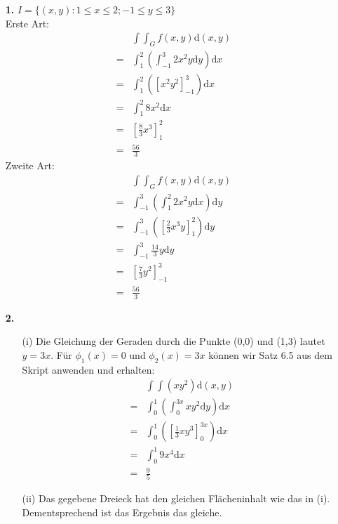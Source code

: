 \documentclass[a4paper,11pt]{article}
\title{\titleinfo}
\author{\authorinfotitle}
\date{\today}
\begin{document}
\maketitle
    \begin{enumerate}

            \item[\textbf{1.}]
                $I = \{ (x,y): 1 \leq x \leq 2; -1 \leq y \leq 3 \}$\\
                Erste Art:
                \begin{align}
                    & \int \int_G f(x,y) \mathrm{d}(x,y)\\
                    = & \int_1^2 \left( \int_{-1}^3 2x^2y \mathrm{d}y\right)\mathrm{d}x\\
                    = & \int_1^2 \left( [x^2y^2]_{-1}^3 \right)\mathrm{d}x\\
                    = & \int_1^2 8x^2\mathrm{d}x\\
                    = & [\frac{8}{3}x^3]_1^2\\
                    = & \frac{56}{3}
                \end{align}
                Zweite Art:
                \begin{align}
                    & \int \int_G f(x,y) \mathrm{d}(x,y)\\
                    = & \int_{-1}^3 \left( \int_1^2 2x^2y \mathrm{d}x \right) \mathrm{d}y\\
                    = & \int_{-1}^3 \left( [ \frac{2}{3}x^3 y ]_1^2 \right) \mathrm{d}y\\
                    = & \int_{-1}^3 \frac{14}{3}y \mathrm{d}y\\
                    = & [ \frac{7}{3}y^2 ]_{-1}^{3}\\
                    = & \frac{56}{3}
                \end{align}
            \item[\textbf{2.}]
                \begin{enumerate}
                    \item[(i)]
                        Die Gleichung der Geraden durch die Punkte (0,0) und (1,3) lautet $y=3x$.
                        Für $\phi_1(x) = 0$ und $\phi_2(x)=3x$ können wir Satz 6.5 aus dem Skript anwenden und erhalten:
                        \begin{align*}
                            & \int \int (xy^2) \mathrm{d}(x,y)\\
                            = & \int_0^1 \left( \int_0^{3x} xy^2 \mathrm{d}y \right) \mathrm{d}x\\
                            = & \int_0^1 \left( [\frac{1}{3}xy^3]_0^{3x} \right) \mathrm{d}x\\
                            = & \int_0^1 9x^4 \mathrm{d}x\\
                            = & \frac{9}{5}
                        \end{align*}
                    \item[(ii)]
                        Das gegebene Dreieck hat den gleichen Flächeninhalt wie das in (i). Dementsprechend ist das Ergebnis das gleiche.


\end{enumerate}
\end{enumerate}
\end{document}
